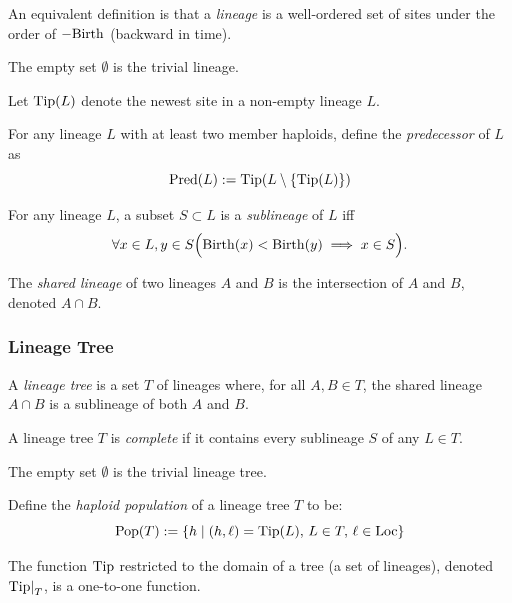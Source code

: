 An equivalent definition is that a \emph{lineage} is a well-ordered set of sites
under the order of $-\mathrm{Birth}$ (backward in time).

The empty set $\emptyset$ is the trivial lineage.

\begin{defin}
Let $\mathrm{Tip}(L)$ denote the newest site in a non-empty lineage $L$.
\end{defin}

\begin{defin}
For any lineage $L$ with at least two member haploids,
define the \emph{predecessor} of $L$ as
\[
  \mathrm{Pred}(L) := \mathrm{Tip}(L \setminus \{ \mathrm{Tip}(L) \})
\]
\end{defin}

\begin{defin}
For any lineage $L$, a subset $S \subset L$ is a \emph{sublineage} of $L$ iff
\[
\forall x \in L, y \in S \Big( \mathrm{Birth}(x) < \mathrm{Birth}(y) \implies x \in S \Big)
\text{.}
\]
\end{defin}

\begin{defin}
The \emph{shared lineage} of two lineages $A$ and $B$ is the intersection of $A$ and
  $B$, denoted $A \cap B$.
\end{defin}


\subsubsection{Lineage Tree}

\begin{defin}
A \emph{lineage tree} is a set $T$ of lineages where,
for all $A, B \in T$, the shared lineage $A \cap B$ is a sublineage of both $A$ and $B$.
\end{defin}

\begin{defin}
A lineage tree $T$ is \emph{complete} if it contains every sublineage $S$ of any $L \in T$.
\end{defin}

The empty set $\emptyset$ is the trivial lineage tree.

\begin{defin}
Define the \emph{haploid population} of a lineage tree $T$ to be:
\[
  \mathrm{Pop}(T) := \{ h \mid (h, \ell) = \mathrm{Tip}(L), \, L \in T, \, \ell \in \mathrm{Loc} \}
\]
\end{defin}

\begin{theorem}
  The function $\mathrm{Tip}$ restricted to the domain of a tree (a set of lineages),
  denoted ${\mathrm{Tip}|}_T$, is a one-to-one function.
\end{theorem}

